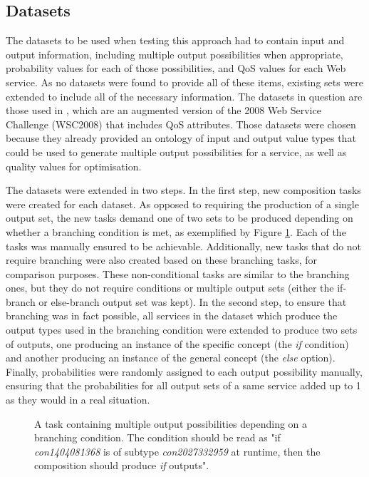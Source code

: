 \documentclass[conference]{IEEEtran}
\begin{document}
\subsection{Datasets}
The datasets to be used when testing this approach had to contain input and output information, including multiple output possibilities when appropriate, probability values for each of those possibilities, and QoS values for each Web service. As no datasets were found to provide all of these items, existing sets were extended to include all of the necessary information. The datasets in question are those used in \cite{wang2013genetic}, which are an augmented version of the 2008 Web Service Challenge (WSC2008) \cite{bansal2008wsc} that includes QoS attributes. Those datasets were chosen because they already provided an ontology of input and output value types that could be used to generate multiple output possibilities for a service, as well as quality values for optimisation.

The datasets were extended in two steps. In the first step, new composition tasks were created for each dataset. As opposed to requiring the production of a single output set, the new tasks demand one of two sets to be produced depending on whether a branching condition is met, as exemplified by Figure \ref{fig:task}. Each of the tasks was manually ensured to be achievable. Additionally, new tasks that do not require branching were also created based on these branching tasks, for comparison purposes. These non-conditional tasks are similar to the branching ones, but they do not require conditions or multiple output sets (either the if-branch or else-branch output set was kept). In the second step, to ensure that branching was in fact possible, all services in the dataset which produce the output types used in the branching condition were extended to produce two sets of outputs, one producing an instance of the specific concept (the \textit{if} condition) and another producing an instance of the general concept (the \textit{else} option). Finally, probabilities were randomly assigned to each output possibility manually, ensuring that the probabilities for all output sets of a same service added up to 1 as they would in a real situation.

\begin{figure}
\centerline{
}
 \caption{A task containing multiple output possibilities depending on a branching condition. The condition should be read as "if \textit{con1404081368} is of subtype \textit{con2027332959} at runtime, then the composition should produce \textit{if} outputs".}
 \label{fig:task}
\end{figure}
\end{document}
